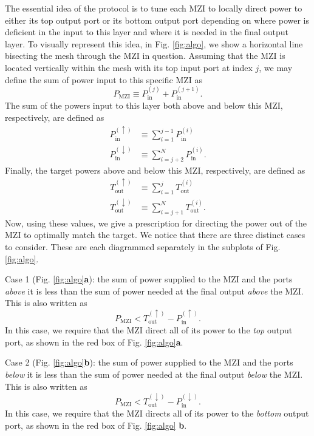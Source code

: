 The essential idea of the protocol is to tune each MZI to locally direct power to either its top output port or its bottom output port depending on where power is deficient in the input to this layer and where it is needed in the final output layer. To visually represent this idea, in Fig. \ref{fig:algo}, we show a horizontal line bisecting the mesh through the MZI in question.  Assuming that the MZI is located vertically within the mesh with its top input  port at index $j$, we may define the sum of power input to this specific MZI as
%
\begin{equation}
    P_\textrm{MZI} \equiv P_\textrm{in}^{(j)} + P_\textrm{in}^{(j+1)}.
\end{equation}
%
The sum of the powers input to this layer both above and below this MZI, respectively, are defined as
%
\begin{align}
    P_\textrm{in}^{(\uparrow)} &\equiv \sum_{i=1}^{j-1} P_\textrm{in}^{(i)}\\
    P_\textrm{in}^{(\downarrow)} &\equiv \sum_{i=j+2}^N P_\textrm{in}^{(i)}.
\end{align}
%
Finally, the target powers above and below this MZI, respectively, are defined as
%
\begin{align}
    T_\textrm{out}^{(\uparrow)} &\equiv \sum_{i=1}^j T_\textrm{out}^{(i)} \\
    T_\textrm{out}^{(\downarrow)} &\equiv \sum_{i=j+1}^N T_\textrm{out}^{(i)}.
\end{align}
%
Now, using these values, we give a prescription for directing the power out of the MZI to optimally match the target.  We notice that there are three distinct cases to consider.  These are each diagrammed separately in the subplots of Fig. \ref{fig:algo}.  

Case 1 (Fig. \ref{fig:algo}\textbf{a}):  the sum of power supplied to the MZI and the ports \textit{above} it is less than the sum of power needed at the final output \textit{above} the MZI.  This is also written as
\begin{equation}
    P_\textrm{MZI} < T_\textrm{out}^{(\uparrow)} -  P_\textrm{in}^{(\uparrow)}.
\end{equation}
In this case, we require that the MZI direct all of its power to the \textit{top} output port, as shown in the red box of Fig. \ref{fig:algo}\textbf{a}.

Case 2 (Fig. \ref{fig:algo}\textbf{b}):  the sum of power supplied to the MZI and the ports \textit{below} it is less than the sum of power needed at the final output \textit{below} the MZI.  This is also written as
\begin{equation}
    P_\textrm{MZI} < T_\textrm{out}^{(\downarrow)} - P_\textrm{in}^{(\downarrow)}.
\end{equation}
In this case, we require that the MZI directs all of its power to the \textit{bottom} output port, as shown in the red box of Fig. \ref{fig:algo} \textbf{b}.

